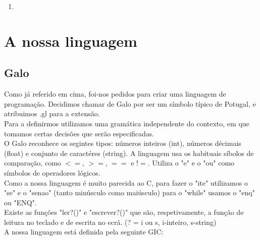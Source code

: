 \documentclass{report}
\begin{document}
\begin{enumerate}[1)]
	\item

\end{enumerate}

\section{A nossa linguagem}
\subsection{Galo}
\indent
Como já referido em cima, foi-nos pedidos para criar uma linguagem de programação. Decidimos chamar de Galo por ser um símbolo típico de Potugal, e atribuimos .gl para a extensão.\\
\indent
Para a definirmos utilizamos uma gramática independente do contexto, em que tomamos certas decisões que serão especificadas.\\
\indent
O Galo reconhece os segintes tipos: números inteiros (int), números décimais  (float) e conjunto de caractéres (string). A linguagem usa os habituais síbolos de comparação, como $<=$, $>=$, $==$ e $!=$. Utiliza o "e" e o "ou" como símbolos de operadores lógicos.\\
\indent
Como a nossa linguagem é muito parecida ao C, para fazer o "ite" utilizamos o "se" e o "senao" (tanto minúsculo como maiúsculo) para o "while" usamos o "enq" ou "ENQ".\\
\indent
Existe as funções "ler?()" e "escrever?()" que são, respetivamente, a função de leitura no teclado e de escrita no ecrã. (? = i ou s, i-inteiro, s-string) \\

\indent
A nossa linguagem está definida pela seguinte GIC:
\end{document}
